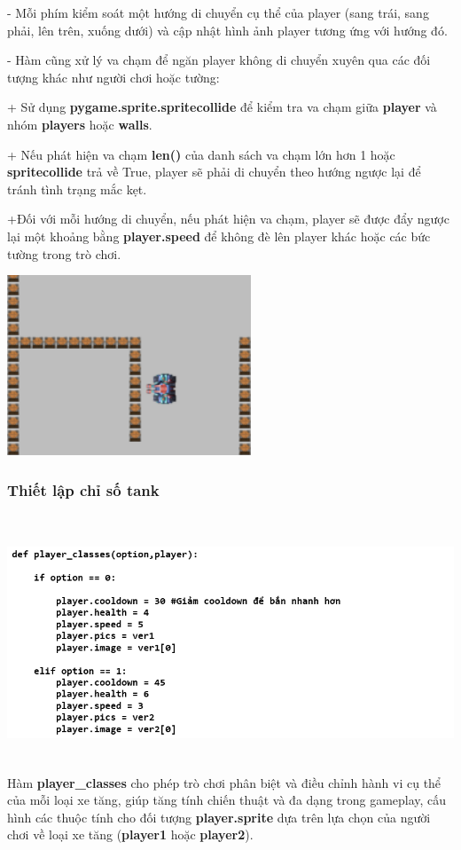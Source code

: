 \documentclass[a4paper]{article}
\begin{document}
- Mỗi phím kiểm soát một hướng di chuyển cụ thể của player (sang trái,
sang phải, lên trên, xuống dưới) và cập nhật hình ảnh player tương ứng
với hướng đó.

- Hàm cũng xử lý va chạm để ngăn player không di chuyển xuyên qua các
đối tượng khác như người chơi hoặc tường:

+ Sử dụng \textbf{pygame.sprite.spritecollide} để kiểm tra va chạm giữa
\textbf{player} và nhóm \textbf{players} hoặc \textbf{walls}.

+ Nếu phát hiện va chạm \textbf{len()} của danh sách va chạm lớn hơn 1
hoặc \textbf{spritecollide} trả về True, player sẽ phải di chuyển theo
hướng ngược lại để tránh tình trạng mắc kẹt.

+Đối với mỗi hướng di chuyển, nếu phát hiện va chạm, player sẽ được đẩy
ngược lại một khoảng bằng \textbf{player.speed} để không đè lên player
khác hoặc các bức tường trong trò chơi. 

\includegraphics[width=2.86389in,height=2.11528in]{image45.png}
\subsubsection{Thiết lập chỉ số tank}
\includegraphics[width=6in,height=3in]{image45_1.png}
Hàm \textbf{player\_classes} cho phép trò chơi phân biệt và điều chỉnh
hành vi cụ thể của mỗi loại xe tăng, giúp tăng tính chiến thuật và đa
dạng trong gameplay, cấu hình các thuộc tính cho đối tượng
\textbf{player.sprite} dựa trên lựa chọn của người chơi về loại xe tăng
(\textbf{player1} hoặc \textbf{player2}).
\end{document}
